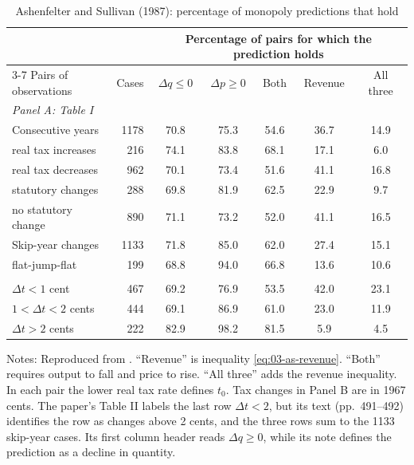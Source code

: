 \begin{table}[htbp]
\centering
\caption{Ashenfelter and Sullivan (1987): percentage of monopoly predictions that hold}
\label{tab:03-as-tests}
\begin{tabular}{lrccccc}
\toprule
 & & \multicolumn{5}{c}{Percentage of pairs for which the prediction holds} \\
\cmidrule(lr){3-7}
Pairs of observations & Cases & $\Delta q \le 0$ & $\Delta p \ge 0$ & Both & Revenue & All three \\
\midrule
\multicolumn{7}{l}{\textit{Panel A: Table I}} \\
Consecutive years & 1178 & 70.8 & 75.3 & 54.6 & 36.7 & 14.9 \\
\quad real tax increases & 216 & 74.1 & 83.8 & 68.1 & 17.1 & 6.0 \\
\quad real tax decreases & 962 & 70.1 & 73.4 & 51.6 & 41.1 & 16.8 \\
\quad statutory changes & 288 & 69.8 & 81.9 & 62.5 & 22.9 & 9.7 \\
\quad no statutory change & 890 & 71.1 & 73.2 & 52.0 & 41.1 & 16.5 \\
Skip-year changes & 1133 & 71.8 & 85.0 & 62.0 & 27.4 & 15.1 \\
\quad flat-jump-flat & 199 & 68.8 & 94.0 & 66.8 & 13.6 & 10.6 \\
\addlinespace
\multicolumn{7}{l}{\textit{Panel B: Table II, skip-year changes by size of the tax change}} \\
$\Delta t < 1$ cent & 467 & 69.2 & 76.9 & 53.5 & 42.0 & 23.1 \\
$1 < \Delta t < 2$ cents & 444 & 69.1 & 86.9 & 61.0 & 23.0 & 11.9 \\
$\Delta t > 2$ cents & 222 & 82.9 & 98.2 & 81.5 & 5.9 & 4.5 \\
\bottomrule
\end{tabular}

\smallskip
\begin{minipage}{0.95\textwidth}
\footnotesize Notes: Reproduced from \citet[Tables I and II]{AshenfelterSullivan1987}. ``Revenue'' is
inequality \eqref{eq:03-as-revenue}. ``Both'' requires output to fall and price to rise. ``All three'' adds
the revenue inequality. In each pair the lower real tax rate defines $t_0$. Tax changes in Panel B are in 1967
cents. The paper's Table II labels the last row $\Delta t < 2$, but its text (pp.~491--492) identifies the row
as changes above 2 cents, and the three rows sum to the 1133 skip-year cases. Its first column header reads
$\Delta q \ge 0$, while its note defines the prediction as a decline in quantity.
\end{minipage}
\end{table}

